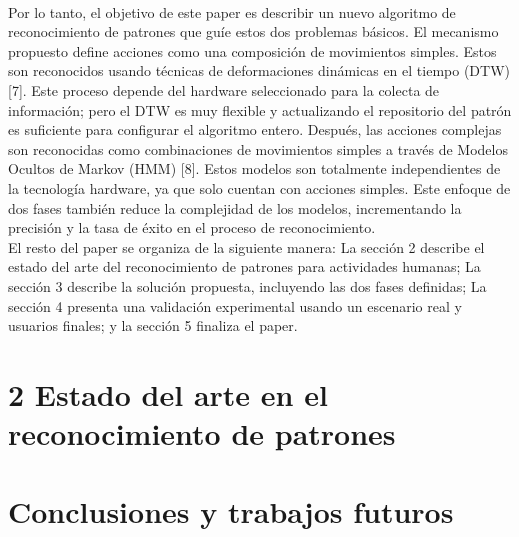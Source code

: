\documentclass[10pt]{article}
\begin{document}
\\
Por lo tanto, el objetivo de este paper es describir un nuevo algoritmo de reconocimiento de patrones que guíe estos dos problemas básicos. El mecanismo propuesto define acciones como una composición de movimientos simples. Estos son reconocidos usando técnicas de deformaciones dinámicas en el tiempo (DTW) [7]. Este proceso depende del hardware seleccionado para la colecta de información; pero el DTW  es muy flexible y actualizando el repositorio del patrón es suficiente para configurar el algoritmo entero. Después, las acciones complejas son reconocidas como combinaciones de movimientos simples a través de Modelos Ocultos de Markov (HMM) [8]. Estos modelos son totalmente independientes de la tecnología hardware, ya que solo cuentan con acciones simples. Este enfoque de dos fases también reduce la complejidad de los modelos, incrementando la precisión y la tasa de éxito en el proceso de reconocimiento.
\\
El resto del paper se organiza de la siguiente manera: La sección 2 describe el estado del arte del reconocimiento de patrones para actividades humanas; La sección 3 describe la solución propuesta, incluyendo las dos fases definidas; La sección 4 presenta una validación experimental usando un escenario real y usuarios finales; y la sección 5 finaliza el paper.

\section{2 Estado del arte en el reconocimiento de patrones}


\section{Conclusiones y trabajos futuros}
\end{document}
